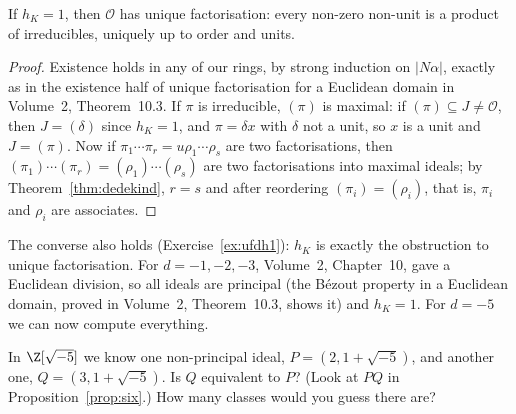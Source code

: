 \begin{proposition}\label{prop:h1}
If $h_K=1$, then $\mathcal O$ has unique factorisation: every non-zero non-unit is a product of irreducibles, uniquely up to order and units.
\end{proposition}
\begin{proof}
Existence holds in any of our rings, by strong induction on $|N\alpha|$, exactly as in the existence half of unique factorisation for a Euclidean domain in Volume~2, Theorem~10.3. If $\pi$ is irreducible, $(\pi)$ is maximal: if $(\pi)\subseteq J\ne\mathcal O$, then $J=(\delta)$ since $h_K=1$, and $\pi=\delta x$ with $\delta$ not a unit, so $x$ is a unit and $J=(\pi)$. Now if $\pi_1\cdots\pi_r=u\rho_1\cdots\rho_s$ are two factorisations, then $(\pi_1)\cdots(\pi_r)=(\rho_1)\cdots(\rho_s)$ are two factorisations into maximal ideals; by Theorem~\ref{thm:dedekind}, $r=s$ and after reordering $(\pi_i)=(\rho_i)$, that is, $\pi_i$ and $\rho_i$ are associates.
\end{proof}

The converse also holds (Exercise~\ref{ex:ufdh1}): $h_K$ is exactly the obstruction to unique factorisation. For $d=-1,-2,-3$, Volume~2, Chapter~10, gave a Euclidean division, so all ideals are principal (the B\'ezout property in a Euclidean domain, proved in Volume~2, Theorem~10.3, shows it) and $h_K=1$. For $d=-5$ we can now compute everything.

\begin{think}
In $\Z[\sqrt{-5}]$ we know one non-principal ideal, $P=(2,1+\sqrt{-5})$, and another one, $Q=(3,1+\sqrt{-5})$. Is $Q$ equivalent to $P$? (Look at $PQ$ in Proposition~\ref{prop:six}.) How many classes would you guess there are?
\end{think}

